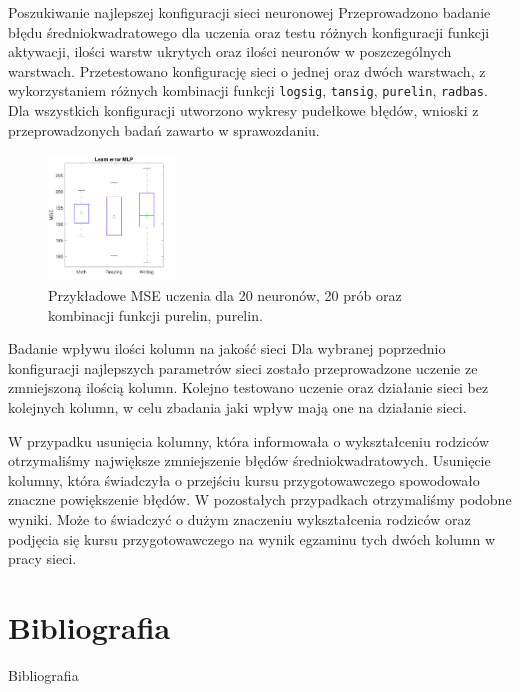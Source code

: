 \documentclass[10pt]{beamer}
\begin{document}
\begin{frame}[fragile]{Poszukiwanie najlepszej konfiguracji sieci neuronowej}
Przeprowadzono badanie błędu średniokwadratowego dla uczenia oraz testu różnych konfiguracji funkcji aktywacji, ilości warstw ukrytych oraz ilości neuronów w poszczególnych warstwach.
Przetestowano konfigurację sieci o jednej oraz dwóch warstwach, z wykorzystaniem różnych kombinacji funkcji \verb+logsig+, \verb+tansig+, \verb+purelin+, \verb+radbas+. Dla wszystkich konfiguracji utworzono wykresy pudełkowe błędów, wnioski z przeprowadzonych badań zawarto w sprawozdaniu.

\begin{figure}[H]
\centering
\includegraphics[width=0.3\textwidth]{../report/static/purelin_purelin_20_learnBoxplot.pdf}
\caption{Przykładowe MSE uczenia dla 20 neuronów, 20 prób oraz kombinacji funkcji purelin, purelin.}
\end{figure}

\end{frame}

\begin{frame}[fragile]{Badanie wpływu ilości kolumn na jakość sieci}
Dla wybranej poprzednio konfiguracji najlepszych parametrów sieci zostało przeprowadzone uczenie ze zmniejszoną ilością kolumn. Kolejno testowano uczenie oraz działanie sieci bez kolejnych kolumn, w celu zbadania jaki wpływ mają one na działanie sieci.



W przypadku usunięcia  kolumny, która informowała o wykształceniu rodziców otrzymaliśmy największe zmniejszenie błędów średniokwadratowych. Usunięcie  kolumny, która świadczyła o przejściu kursu przygotowawczego spowodowało znaczne powiększenie błędów. W pozostałych przypadkach otrzymaliśmy podobne wyniki. Może to świadczyć o dużym znaczeniu wykształcenia rodziców oraz podjęcia się kursu przygotowawczego na wynik egzaminu tych dwóch kolumn w pracy sieci.

\end{frame}

\section{Bibliografia}
\begin{frame}[allowframebreaks]{Bibliografia}


\nocite{*}
\end{frame}
\end{document}
